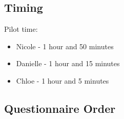 \documentclass[]{book}
\providecommand{\tightlist}{%
  \setlength{\itemsep}{0pt}\setlength{\parskip}{0pt}}
\begin{document}
\hypertarget{timing}{%
\subsection{Timing}\label{timing}}

Pilot time:

\begin{itemize}
\tightlist
\item
  Nicole - 1 hour and 50 minutes
\item
  Danielle - 1 hour and 15 minutes
\item
  Chloe - 1 hour and 5 minutes
\end{itemize}

\hypertarget{questionnaire-order}{%
\subsection{Questionnaire Order}\label{questionnaire-order}}
\end{document}
